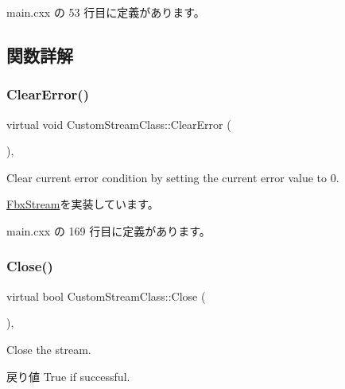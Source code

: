  main.\+cxx の 53 行目に定義があります。



\subsection{関数詳解}
\mbox{\label{class_custom_stream_class_a4eb6319d8b82c6f520465e90f0165449}} 
\subsubsection{\texorpdfstring{Clear\+Error()}{ClearError()}}
{\footnotesize\ttfamily virtual void Custom\+Stream\+Class\+::\+Clear\+Error (\begin{DoxyParamCaption}{ }\end{DoxyParamCaption})\hspace{0.3cm}{\ttfamily [inline]}, {\ttfamily [virtual]}}

Clear current error condition by setting the current error value to 0. 

\hyperlink{class_fbx_stream_ad90dfab257677bb8cd62efb9d65d3a02}{Fbx\+Stream}を実装しています。



 main.\+cxx の 169 行目に定義があります。

\mbox{\label{class_custom_stream_class_a8871348021c69d6912a12298626195f6}} 
\subsubsection{\texorpdfstring{Close()}{Close()}}
{\footnotesize\ttfamily virtual bool Custom\+Stream\+Class\+::\+Close (\begin{DoxyParamCaption}{ }\end{DoxyParamCaption})\hspace{0.3cm}{\ttfamily [inline]}, {\ttfamily [virtual]}}

Close the stream. \begin{DoxyReturn}{戻り値}
True if successful. 
\end{DoxyReturn}


